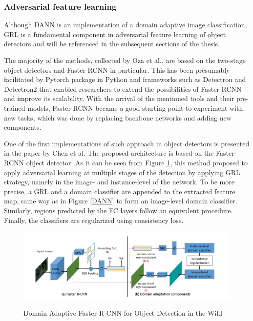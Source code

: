 \documentclass[english, 12pt, a4paper, elec, utf8, a-1b, online]{aaltothesis}
\begin{document}
\subsubsection{Adversarial feature learning}
\label{adv_approach} 

Although DANN is an implementation of a domain adaptive image classification, GRL is a fundamental component in adversarial feature learning of object detectors and will be referenced in the subsequent sections of the thesis. 

The majority of the methods, collected by Oza et al.\cite{Oza2021}, are based on the two-stage object detectors and Faster-RCNN \cite{ima} in particular. This has been presumably facilitated by Pytorch \cite{NEURIPS2019_9015} package in Python and frameworks such as Detectron \cite{Detectron2018} and Detectron2 \cite{wu2019detectron2} that enabled researchers to extend the possibilities of Faster-RCNN and improve its scalability. With the arrival of the mentioned tools and their pre-trained models, Faster-RCNN became a good starting point to experiment with new tasks, which was done by replacing backbone networks and adding new components. 

One of the first implementations of such approach in object detectors is presented in the paper by Chen et al\cite{Chen2018}. The proposed architecture is based on the Faster-RCNN object detector. As it can be seen from Figure \ref{Faster_rcnn_DA}, this method proposed to apply adversarial learning at multiple stages of the detection by applying GRL strategy, namely in the image- and instance-level of the network. To be more precise, a GRL and a domain classifier are appended to the extracted feature map, same way as in Figure \ref{DANN} to form an image-level domain classifier. Similarly, regions predicted by the FC layers follow an equivalent procedure. Finally, the classifiers are regularized using consistency loss.   

\begin{figure}[htb]
	\begin{center}
		\includegraphics[width=16cm]{./faster_rcnn_DA.png}
	\end{center}
	\caption{Domain Adaptive Faster R-CNN for Object Detection in the Wild\cite{Chen2018}}
	\begin{center}
		\label{Faster_rcnn_DA}
	\end{center}
\end{figure}
\FloatBarrier
\end{document}
